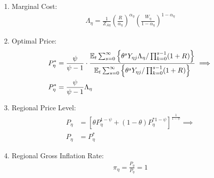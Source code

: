 \documentclass[../thesis.tex]{subfiles}
\begin{document}
\begin{enumerate}
\begin{comment}
			\item Production Function:
		\begin{align}
			Y_{\eta j} = Z_{A\eta} L_{\eta j} \label{ext-mod:reg-ss-int-good-firm-production-function}
		\end{align}
		
		\item Marginal Cost:
		\begin{align}
			\Lambda_{\eta} = \frac{W_{\eta}}{Z_{A\eta}} \label{ext-mod:reg-ss-int-good-firm-FOC-Lt}
		\end{align}		
		
	\end{comment}
	
	\item Marginal Cost:
	\begin{align}
		\Lambda_{\eta} = \frac{1}{Z_{A\eta}} \left( \frac{R_{}}{{\alpha_{\eta}}} \right)^{{\alpha_{\eta}}} \left( \frac{W_{\eta}}{1-\alpha_{\eta}} \right)^{1-\alpha_{\eta}} \label{ext-mod:reg-ss-int-good-firm-MC-2}
	\end{align}
	
	\item Optimal Price:
	\begin{align}
		P_{\eta}^{\ast} &= \frac{\psi}{\psi-1} \cdot \frac{ {\mathbb{E}_{t}} \sum_{s=0}^{\infty} \left\{ \theta^s Y_{\eta j} \Lambda_{\eta} / \prod_{k=0}^{s-1}(1+R_{}) \right\}} {{\mathbb{E}_{t}} \sum_{s=0}^{\infty} \left\{ \theta^s Y_{\eta j} / \prod_{k=0}^{s-1}(1 + R_{}) \right\}} \implies \nonumber \\
		P_{\eta}^{\ast} &= \frac{\psi}{\psi-1} \Lambda_{\eta} \label{ext-mod:reg-ss-int-good-firm-optimal-price-FOC-3}
	\end{align}
	
	\item Regional Price Level:
	\begin{align}
		P_{\eta} &= \left[ \theta P_{\eta}^{1-\psi} + (1-\theta) P_{\eta}^{\ast 1-\psi} \right]^\frac{1}{1-\psi} \implies \nonumber \\
		P_{\eta} &= P_{\eta}^{\ast} \label{ext-mod:reg-ss-general-price-level}
	\end{align}
	
	\item Regional Gross Inflation Rate:
	\begin{align}
		\pi_{\eta} = \frac{P_{\eta}}{P_{\eta}} = 1 \label{ext-mod:reg-ss-regional-inflation}
	\end{align}
	
	\begin{comment}
			\item Intermediate-goods Firms Profit:
		\begin{align}
			\Pi_{\eta} &= \int_{0}^{1} P_{\eta} Y_{\eta j} - W_{\eta} L_{\eta j} \dif j \label{ext-mod:reg-ss-int-good-firm-profit-total-2}
		\end{align}
		

\end{comment}
\end{enumerate}
\end{document}
